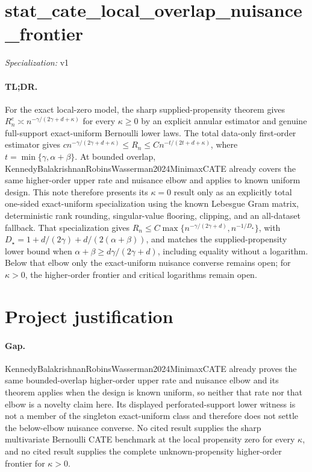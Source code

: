 \documentclass{article}
\begin{document}
\sloppy

\section*{stat\_\allowbreak{}cate\_\allowbreak{}local\_\allowbreak{}overlap\_\allowbreak{}nuisance\_\allowbreak{}frontier}

\noindent\textit{Specialization:} v1\par

\paragraph{TL;DR.} For the exact local-zero model, the sharp supplied-propensity theorem gives \(R_n^e\asymp n^{-\gamma/(2\gamma+d+\kappa)}\) for every \(\kappa\geq0\) by an explicit annular estimator and genuine full-support exact-uniform Bernoulli lower laws.  The total data-only first-order estimator gives \(c n^{-\gamma/(2\gamma+d+\kappa)}\leq R_n\leq C n^{-t/(2t+d+\kappa)}\), where \(t=\min\{\gamma,\alpha+\beta\}\).  At bounded overlap, KennedyBalakrishnanRobinsWasserman2024MinimaxCATE already covers the same higher-order upper rate and nuisance elbow and applies to known uniform design.  This note therefore presents its \(\kappa=0\) result only as an explicitly total one-sided exact-uniform specialization using the known Lebesgue Gram matrix, deterministic rank rounding, singular-value flooring, clipping, and an all-dataset fallback.  That specialization gives \(R_n\leq C\max\{n^{-\gamma/(2\gamma+d)},n^{-1/D_\star}\}\), with \(D_\star=1+d/(2\gamma)+d/(2(\alpha+\beta))\), and matches the supplied-propensity lower bound when \(\alpha+\beta\geq d\gamma/(2\gamma+d)\), including equality without a logarithm.  Below that elbow only the exact-uniform nuisance converse remains open; for \(\kappa>0\), the higher-order frontier and critical logarithms remain open.

\section{Project justification}

\paragraph{Gap.} KennedyBalakrishnanRobinsWasserman2024MinimaxCATE already proves the same bounded-overlap higher-order upper rate and nuisance elbow and its theorem applies when the design is known uniform, so neither that rate nor that elbow is a novelty claim here.  Its displayed perforated-support lower witness is not a member of the singleton exact-uniform class and therefore does not settle the below-elbow nuisance converse.  No cited result supplies the sharp multivariate Bernoulli CATE benchmark at the local propensity zero for every \(\kappa\), and no cited result supplies the complete unknown-propensity higher-order frontier for \(\kappa>0\).
\end{document}
